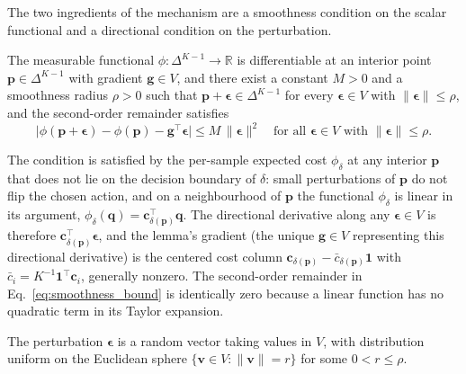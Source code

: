The two ingredients of the mechanism are a smoothness condition on the scalar functional and a directional condition on the perturbation.

\begin{assumption}\label{ass:smoothness}
    The measurable functional $\phi : \Delta^{K-1} \to \mathbb{R}$ is differentiable at an interior point $\mathbf{p} \in \Delta^{K-1}$ with gradient $\mathbf{g} \in V$, and there exist a constant $M > 0$ and a smoothness radius $\rho > 0$ such that $\mathbf{p} + \boldsymbol{\epsilon} \in \Delta^{K-1}$ for every $\boldsymbol{\epsilon} \in V$ with $\|\boldsymbol{\epsilon}\| \leq \rho$, and the second-order remainder satisfies
    \begin{equation}\label{eq:smoothness_bound}
        \bigl|\phi(\mathbf{p} + \boldsymbol{\epsilon}) - \phi(\mathbf{p}) - \mathbf{g}^\top \boldsymbol{\epsilon}\bigr| \leq M\,\|\boldsymbol{\epsilon}\|^2 \quad \text{for all } \boldsymbol{\epsilon} \in V \text{ with } \|\boldsymbol{\epsilon}\| \leq \rho.
    \end{equation}
\end{assumption}

The condition is satisfied by the per-sample expected cost $\phi_\delta$ at any interior $\mathbf{p}$ that does not lie on the decision boundary of $\delta$: small perturbations of $\mathbf{p}$ do not flip the chosen action, and on a neighbourhood of $\mathbf{p}$ the functional $\phi_\delta$ is linear in its argument, $\phi_\delta(\mathbf{q}) = \mathbf{c}_{\delta(\mathbf{p})}^\top \mathbf{q}$. The directional derivative along any $\boldsymbol{\epsilon} \in V$ is therefore $\mathbf{c}_{\delta(\mathbf{p})}^\top \boldsymbol{\epsilon}$, and the lemma's gradient (the unique $\mathbf{g} \in V$ representing this directional derivative) is the centered cost column $\mathbf{c}_{\delta(\mathbf{p})} - \bar{c}_{\delta(\mathbf{p})}\mathbf{1}$ with $\bar{c}_i = K^{-1}\mathbf{1}^\top \mathbf{c}_i$, generally nonzero. The second-order remainder in Eq.~\eqref{eq:smoothness_bound} is identically zero because a linear function has no quadratic term in its Taylor expansion.

\begin{assumption}\label{ass:diffuse}
    The perturbation $\boldsymbol{\epsilon}$ is a random vector taking values in $V$, with distribution uniform on the Euclidean sphere $\{\mathbf{v} \in V : \|\mathbf{v}\| = r\}$ for some $0 < r \leq \rho$.
\end{assumption}

